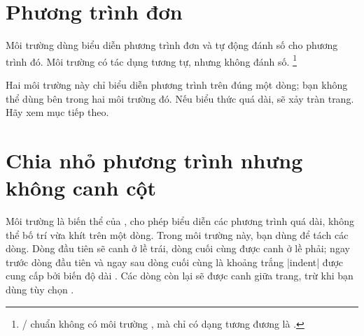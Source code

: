 \documentclass[11pt,leqno,titlepage,openany]{amsldoc}[1999/12/13]
\begin{document}
\section{Phương trình đơn}

Môi trường  dùng biểu diễn phương trình đơn
và tự động đánh số cho phương trình đó. Môi trường 
có tác dụng tương tự, nhưng không đánh số.%
\footnote{\latex/ chuẩn không có môi trường , mà
chỉ có dạng tương đương là .}

\medskip

Hai môi trường này chỉ biểu diễn phương trình trên đúng một dòng;
bạn không thể dùng \cn{\\} bên trong hai môi trường đó.
Nếu biểu thức quá dài, sẽ xảy tràn trang. Hãy xem mục tiếp theo.

\section{Chia nhỏ phương trình nhưng không canh cột}

Môi trường  là biến thể của , cho phép
biểu diễn các phương trình quá dài, không thể bố trí vừa khít trên một dòng.
Trong môi trường này, bạn dùng \cn{\\} để tách các dòng.
Dòng đầu tiên sẽ canh ở lề trái, dòng cuối cùng được canh ở lề phải;
ngay trước dòng đầu tiên và ngay sau dòng cuối cùng là khoảng trắng |indent|
được cung cấp bởi biến độ dài .
Các dòng còn lại sẽ được canh giữa trang, trừ khi bạn dùng tùy chọn .
\end{document}
